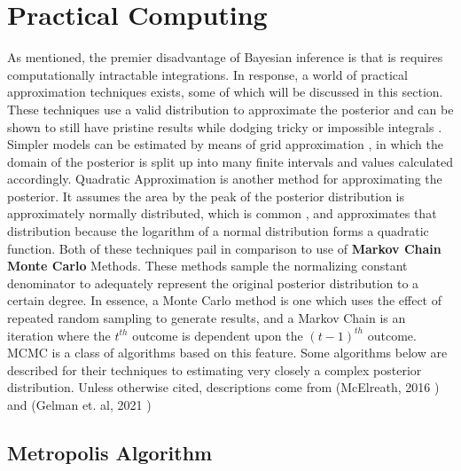 \section{Practical Computing} %

As mentioned, the premier disadvantage of Bayesian inference is that is requires computationally intractable integrations.  In response, a world of practical approximation techniques exists, some of which will be discussed in this section.  These techniques use a valid distribution to approximate the posterior and can be shown to still have pristine results while dodging tricky or impossible integrals \cite{tipping2004bayesian}.
Simpler models can be estimated by means of grid approximation \cite{mcelreath2016statistical}, in which the domain of the posterior is split up into many finite intervals and values calculated accordingly.  Quadratic Approximation is another method for approximating the posterior.  It assumes the area by the peak of the posterior distribution is approximately normally distributed, which is common \cite{mcelreath2016statistical}, and approximates that distribution because the logarithm of a normal distribution forms a quadratic function.  Both of these techniques pail in comparison to use of \textbf{Markov Chain Monte Carlo} Methods.  These methods sample the normalizing constant denominator to adequately represent the original posterior distribution to a certain degree.  In essence, a Monte Carlo method is one which uses the effect of repeated random sampling to generate results, and a Markov Chain is an iteration where the $t^{th}$ outcome is dependent upon the $(t-1)^{th}$ outcome.  MCMC is a class of algorithms based on this feature.  Some algorithms below are described for their techniques to estimating very closely a complex posterior distribution.  Unless otherwise cited, descriptions come from (McElreath, 2016 \cite{mcelreath2016statistical}) and (Gelman et. al, 2021 \cite{gelmanbayesian3}) 



\subsection{Metropolis Algorithm}


